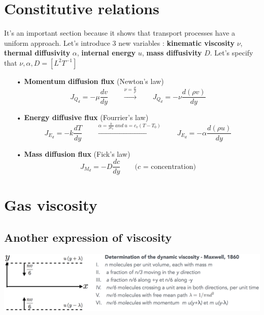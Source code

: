 \section{Constitutive relations}
It's an important section because it shows that transport processes have a uniform approach. Let's introduce 3 new variables : \textbf{kinematic viscosity} $\nu$, \textbf{thermal diffusivity }$\alpha$, \textbf{internal energy} $u$, \textbf{mass diffusivity} $D$. Let's specify that $\nu , \alpha , D = [L^2T^{-1}]$\\
\begin{itemize}
	\item[•] \textbf{Momentum diffusion flux} (Newton's law)
	      \begin{equation}
	      	J_{Q_d}=-\mu \frac{dv}{dy} \qquad \xrightarrow {\nu = \frac{\mu}{\rho}} \qquad J_{Q_d}=-\nu \frac{d(\rho v)}{dy}
	      	\label{equation:1.11}
	      \end{equation}
	      		
	\item[•] \textbf{Energy diffusive flux} (Fourrier's law)
	      \begin{equation}
	      	J_{E_d} = -k\frac{dT}{dy} \qquad \xrightarrow{\alpha = \frac{k}{\rho c_v} \ and \ u = c_v(T-T_0)} \qquad J_{E_d} = -\alpha\frac{d(\rho u)}{dy}
	      \end{equation}
	      		
	\item[•] \textbf{Mass diffusion flux} (Fick's law)
	      \begin{equation}
	      	J_{M_d} = -D \frac{dc}{dy} \qquad \mbox{($c$ = concentration)}
	      \end{equation}
\end{itemize}
	\newpage
\section{Gas viscosity}
\subsection{Another expression of viscosity}
\begin{center}
	\includegraphics[scale=0.45]{ch1/8}
\end{center}
	

